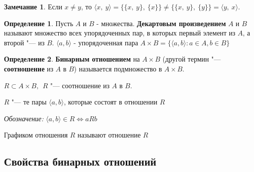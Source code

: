 \documentclass[12pt,oneside]{article}
\theoremstyle{definition}
\newtheorem{definition}{Определение}
\newtheorem{remark}{Замечание}[section]
\begin{document}
\begin{remark}
Если $x\neq y$, то $ \langle x,\ y\rangle = \{ \{x,\ y\},\ \{x\} \} \neq \{ \{x,\ y\},\ \{y\} \} = \langle y,\ x\rangle$.
\end{remark}

\begin{definition}\label{dec_mult}
Пусть $A$ и $B$ - множества. \textbf{Декартовым произведением} $A$ и $B$ называют множество всех упорядоченных пар, в которых первый элемент из $A$, а второй "--- из $B$.
$\langle a, b \rangle$ - упорядоченная пара
$A\times B = \{\langle a, b\rangle : a\in A, b\in B\}$
\end{definition}

\begin{definition}\label{bin_relation}
\textbf{Бинарным отношением} на $A\times B$ (другой термин "--- \textbf{соотношение} из $A$ в $B$) называется подмножество в $A\times B$.
\end{definition}

$R\subset A\times B,\ \ R $ "--- соотношение из $A$ в $B$.

$R$ "--- те пары $\langle a, b\rangle$, которые состоят в отношении $R$

{\it Обозначение: } $\langle a, b\rangle \in R \Leftrightarrow aRb$

Графиком отношения $R$ называют отношение $R$



\subsection{Свойства бинарных отношений}
\end{document}

